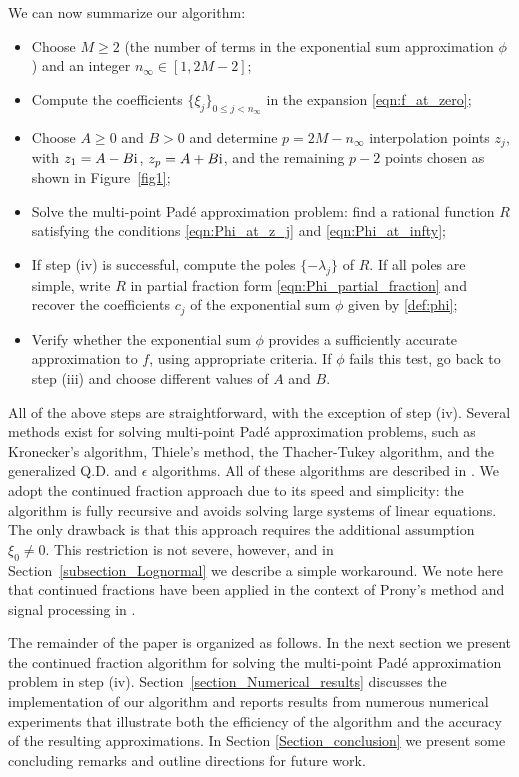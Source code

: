 \documentclass[12pt]{article}
\def\i{{\textnormal i}}
\begin{document}
We can now summarize our algorithm: \label{page_algorithm}
\begin{itemize}
\item[(i)] Choose $M\ge 2$ (the number of terms in the exponential sum approximation $\phi$) and an integer $n_{\infty} \in [1,2M-2]$;
\item[(ii)] Compute the coefficients $\{\xi_j\}_{0\le j < n_{\infty}}$ in the expansion \eqref{eqn:f_at_zero};
\item[(iii)] Choose $A\ge 0$ and $B>0$ and determine $p=2M-n_{\infty}$  interpolation points $z_j$, with $z_1=A-B\i$, $z_{p}=A+B\i$, and the remaining $p-2$ points chosen as shown in Figure~\ref{fig1};
\item[(iv)] Solve the multi-point Pad\'e approximation problem: find a rational function $R$ satisfying the conditions \eqref{eqn:Phi_at_z_j} and \eqref{eqn:Phi_at_infty}; 
\item[(v)] If step (iv) is successful, compute the poles $\{-\lambda_j\}$ of $R$. If all poles are simple, write $R$ in partial fraction form \eqref{eqn:Phi_partial_fraction} and recover the coefficients $c_j$ of the exponential sum $\phi$ given by \eqref{def:phi};
\item[(vi)] Verify whether the exponential sum $\phi$ provides a sufficiently accurate approximation to $f$, using appropriate criteria. If $\phi$ fails this test, go back to step (iii) and choose different values of $A$ and $B$. 
\end{itemize}

All of the above steps are straightforward, with the exception of step (iv). Several methods exist for solving multi-point Pad\'e approximation problems, such as Kronecker's algorithm, Thiele's method, the Thacher-Tukey algorithm, and the generalized Q.D. and $\epsilon$ algorithms. All of these algorithms are described in \cite[Section 1.1]{BakerGravesMorris1981b}. We adopt the continued fraction  approach due to its speed and simplicity: the algorithm is fully recursive and avoids solving large systems of linear equations. The only drawback is that this approach requires the additional assumption  $\xi_0 \neq 0$. This restriction is not severe, however, and in Section~\ref{subsection_Lognormal} we describe a simple workaround. We note here that continued fractions have been applied in the context of Prony's method and signal processing in \cite{Sauer2021}.  

The remainder of the paper is organized as follows. In the next section we present the continued fraction algorithm for solving the multi-point Pad\'e approximation problem in step (iv). Section~\ref{section_Numerical_results} discusses the implementation of our algorithm and reports results from numerous numerical experiments that illustrate both the efficiency of the algorithm and the accuracy of the resulting approximations.  In Section \ref{Section_conclusion} we present some concluding remarks and outline directions for future work. 
\end{document}

